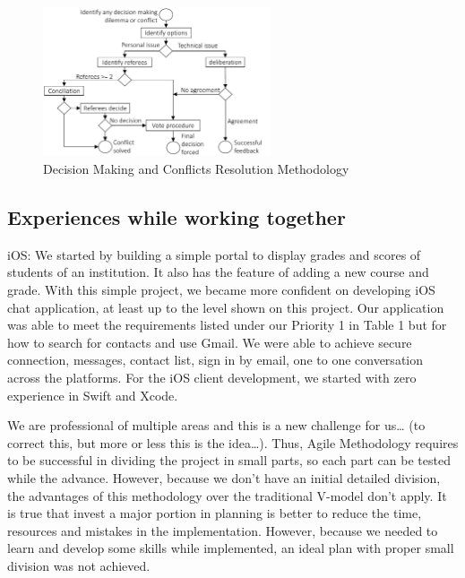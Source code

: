 \begin{figure}[ht]
\centering
\includegraphics[width=0.6\textwidth]{figs/met}
	\caption{Decision Making and Conflicts Resolution Methodology}
	\label{fig:decisions}
\end{figure}






\subsection{Experiences while working together}

iOS: 
We started by building a simple portal to display grades and scores of students of an institution. It also has the feature of adding a new course and grade. With this simple project, we became more confident on developing iOS chat application, at least up to the level shown on this project. Our application was able to meet the requirements listed under our Priority 1 in Table 1 but for how to search for contacts and use Gmail. We were able to achieve secure connection, messages, contact list, sign in by email, one to one conversation across the platforms.
For the iOS client development, we started with zero experience in Swift and Xcode. 

We are professional of multiple areas and this is a new challenge for us…  (to correct this, but more or less this is the idea…). 
Thus, Agile Methodology requires to be successful in dividing the project in small parts, so each part can be tested while the advance. However, because we don't have an initial detailed division, the advantages of this methodology over the traditional V-model don't apply.  It is true that invest a major portion in planning is better to reduce the time, resources and mistakes in the implementation. However, because we needed to learn and develop some skills while implemented, an ideal plan with proper small division was not achieved. 


